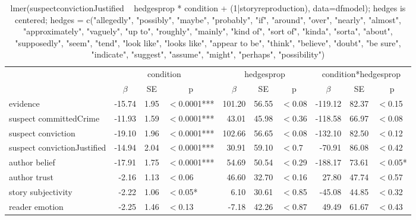 \documentclass[10pt,letterpaper]{article}
\begin{document}
\begin{adjustwidth}{-1in}{-1in}
	\begin{table}
		\centering
		\begin{tabular}{l r r l r r l r r l}
			\toprule
			& \multicolumn{3}{c}{condition} & \multicolumn{3}{c}{hedgesprop} & \multicolumn{3}{c}{condition*hedgesprop} \\
			& \multicolumn{1}{c}{$\beta$} & \multicolumn{1}{c}{SE} & \multicolumn{1}{c}{p} & \multicolumn{1}{c}{$\beta$} & \multicolumn{1}{c}{SE} & \multicolumn{1}{c}{p} & \multicolumn{1}{c}{$\beta$} & \multicolumn{1}{c}{SE} & \multicolumn{1}{c}{p}\\
			\midrule
			evidence                              & -15.74 & 1.95 & $<$0.0001*** & 101.20 & 56.55 & $<$0.08      & -119.12  & 82.37 & $<$0.15  \\
			suspect committedCrime    & -11.93  & 1.59 & $<$0.0001*** & 43.01 & 45.98 & $<$0.36      & -118.58  & 66.97 & $<$0.08  \\
			suspect conviction              & -19.10 & 1.96  & $<$0.0001*** & 102.66 & 56.65 & $<$0.08  & -132.10  & 82.50 & $<$0.12  \\
			suspect convictionJustified & -14.94 & 2.04 & $<$0.0001***  & 30.91 & 59.10 & $<$0.7        & -70.91  & 86.08 & $<$0.42    \\
			author belief                        & -17.91 & 1.75 & $<$0.0001***  & 54.69 & 50.54 & $<$0.29      & -188.17  & 73.61 & $<$0.05* \\
			author trust                          & -2.16   & 1.13 & $<$0.06            & 46.60 & 32.70 & $<$0.16     & 27.80 & 47.74 & $<$0.57   \\
			story subjectivity                 & -2.22   & 1.06 & $<$0.05*          & 6.10 & 30.61 & $<$0.85         & -45.08  & 44.85 & $<$0.32  \\
			reader emotion                    & -2.25   & 1.46 & $<$0.13             & -7.18 & 42.26 & $<$0.87     & 49.49  & 61.67 & $<$0.43  
		\end{tabular}
		\caption{lmer(suspectconvictionJustified ~ hedgesprop * condition + (1|storyreproduction), data=dfmodel); hedges is centered; hedges = c("allegedly", "possibly", "maybe", "probably", "if", "around", "over", "nearly", "almost", "approximately", "vaguely", "up to", "roughly", "mainly", "kind of", "sort of", "kinda", "sorta", "about", "supposedly", "seem", "tend", "look like", "looks like", "appear to be", "think", "believe", "doubt", "be sure", "indicate", "suggest", "assume", "might", "perhaps", "possibility")}
		\label{tab:hedgemodel}
	\end{table}
\end{adjustwidth}
\end{document}

